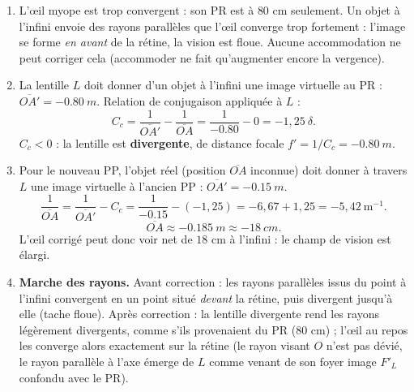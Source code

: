 \documentclass[11pt]{article}
\begin{document}
\begin{corrige}
\begin{enumerate}
\item L'œil myope est trop convergent : son PR est à $80$ cm seulement. Un objet à l'infini envoie des rayons parallèles que l'œil converge trop fortement : l'image se forme \emph{en avant} de la rétine, la vision est floue. Aucune accommodation ne peut corriger cela (accommoder ne fait qu'augmenter encore la vergence).
\item La lentille $L$ doit donner d'un objet à l'infini une image virtuelle au PR : $\overline{OA'} = -\SI{0,80}{m}$. Relation de conjugaison appliquée à $L$ :
\[ C_c = \frac{1}{\overline{OA'}} - \frac{1}{\overline{OA}} = \frac{1}{-\num{0,80}} - 0 = -1,25\ \delta. \]
$C_c < 0$ : la lentille est \textbf{divergente}, de distance focale $f' = 1/C_c = -\SI{0,80}{m}$.
\item Pour le nouveau PP, l'objet réel (position $\overline{OA}$ inconnue) doit donner à travers $L$ une image virtuelle à l'ancien PP : $\overline{OA'} = -\SI{0,15}{m}$.
\[ \frac{1}{\overline{OA}} = \frac{1}{\overline{OA'}} - C_c = \frac{1}{-\num{0,15}} - (-1,25) = -6,67 + 1,25 = -5,42\ \text{m}^{-1}. \]
\[ \overline{OA} \approx -\SI{0,185}{m} \approx -\SI{18}{cm}. \]
L'œil corrigé peut donc voir net de $18$ cm à l'infini : le champ de vision est élargi.
\item \textbf{Marche des rayons.} Avant correction : les rayons parallèles issus du point à l'infini convergent en un point situé \emph{devant} la rétine, puis divergent jusqu'à elle (tache floue). Après correction : la lentille divergente rend les rayons légèrement divergents, comme s'ils provenaient du PR ($80$ cm) ; l'œil au repos les converge alors exactement sur la rétine (le rayon visant $O$ n'est pas dévié, le rayon parallèle à l'axe émerge de $L$ comme venant de son foyer image $F'_L$ confondu avec le PR).
\end{enumerate}
\end{corrige}
\end{document}
